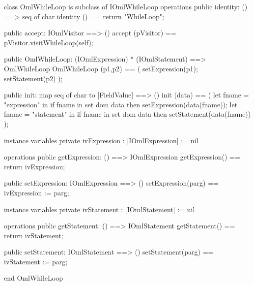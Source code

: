 \begin{vdm_al}
class OmlWhileLoop is subclass of IOmlWhileLoop
operations
  public identity: () ==> seq of char
  identity () == return "WhileLoop";

  public accept: IOmlVisitor ==> ()
  accept (pVisitor) == pVisitor.visitWhileLoop(self);

  public OmlWhileLoop:
      (IOmlExpression) *
      (IOmlStatement) ==> OmlWhileLoop
  OmlWhileLoop (p1,p2) == 
   ( setExpression(p1);
     setStatement(p2) );

  public init: map seq of char to [FieldValue] ==> ()
  init (data) ==
    ( let fname = "expression" in
        if fname in set dom data
        then setExpression(data(fname));
      let fname = "statement" in
        if fname in set dom data
        then setStatement(data(fname)) );

instance variables
  private ivExpression : [IOmlExpression] := nil

operations
  public getExpression: () ==> IOmlExpression
  getExpression() == return ivExpression;

  public setExpression: IOmlExpression ==> ()
  setExpression(parg) == ivExpression := parg;

instance variables
  private ivStatement : [IOmlStatement] := nil

operations
  public getStatement: () ==> IOmlStatement
  getStatement() == return ivStatement;

  public setStatement: IOmlStatement ==> ()
  setStatement(parg) == ivStatement := parg;

end OmlWhileLoop
\end{vdm_al}

